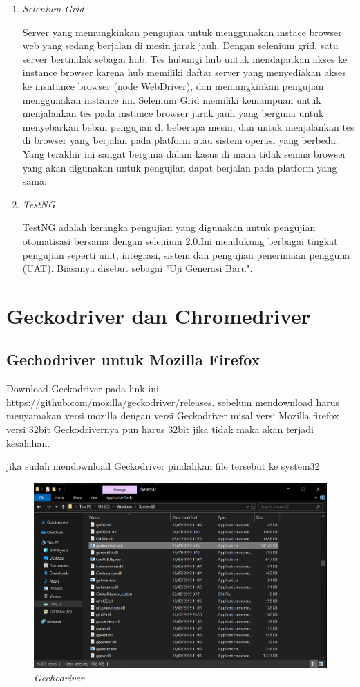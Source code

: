 \begin{enumerate}
\item \textit{Selenium Grid}
\par Server yang memungkinkan pengujian untuk menggunakan instace browser web yang sedang berjalan di mesin jarak jauh. Dengan selenium grid, satu server bertindak sebagai hub. Tes hubungi hub untuk mendapatkan akses ke instance browser karena hub memiliki daftar server yang menyediakan akses ke insntance browser (node WebDriver), dan memungkinkan pengujian menggunakan instance ini. Selenium Grid memiliki kemampuan untuk menjalankan tes pada instance browser jarak jauh yang berguna untuk menyebarkan beban pengujian di beberapa mesin, dan untuk menjalankan tes di browser yang berjalan pada platform atau sistem operasi yang berbeda. Yang terakhir ini sangat berguna dalam kasus di mana tidak semua browser yang akan digunakan untuk pengujian dapat berjalan pada platform yang sama.

\item \textit{TestNG} 
\par TestNG adalah kerangka pengujian yang digunakan untuk pengujian otomatisasi bersama dengan selenium 2.0.Ini mendukung berbagai tingkat pengujian seperti unit, integrasi, sistem dan pengujian penerimaan pengguna (UAT). Biasanya disebut sebagai "Uji Generasi Baru".
\end{enumerate}

\section{Geckodriver dan Chromedriver}
\subsection{Gechodriver untuk Mozilla Firefox}
\par Download Geckodriver pada link ini https://github.com/mozilla/geckodriver/releases. sebelum mendownload harus menyamakan versi mozilla dengan versi Geckodriver misal versi Mozilla firefox versi 32bit Geckodrivernya pun harus 32bit jika tidak maka akan terjadi kesalahan.

jika sudah mendownload Geckodriver pindahkan file tersebut ke system32
\begin{figure}[H]
    \centering
    \includegraphics[scale=0.3]{Figures/figures/gechodriver}
    \caption{\textit{Gechodriver}}
    \label{Geckodriver}
\end{figure}

